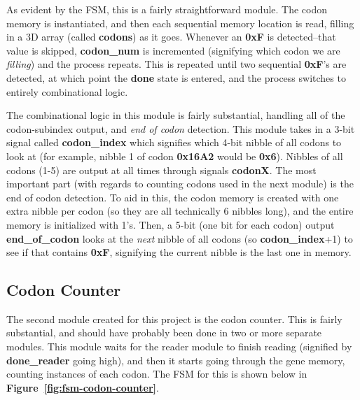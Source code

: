 \documentclass[a4paper, 12pt]{article}
\begin{document}
As evident by the FSM, this is a fairly straightforward module. The codon memory is instantiated, and then each sequential memory location is read, filling in a 3D array (called \textbf{codons}) as it goes. Whenever an \textbf{0xF} is detected--that value is skipped, \textbf{codon\_num} is incremented (signifying which codon we are \textit{filling}) and the process repeats. This is repeated until two sequential \textbf{0xF}'s are detected, at which point the \textbf{done} state is entered, and the process switches to entirely combinational logic. 

The combinational logic in this module is fairly substantial, handling all of the codon-subindex output, and \textit{end of codon} detection. This module takes in a 3-bit signal called \textbf{codon\_index} which signifies which 4-bit nibble of all codons to look at (for example, nibble 1 of codon \textbf{0x16A2} would be \textbf{0x6}). Nibbles of all codons (1-5) are output at all times through signals \textbf{codonX}. The most important part (with regards to counting codons used in the next module) is the end of codon detection. To aid in this, the codon memory is created with one extra nibble per codon (so they are all technically 6 nibbles long), and the entire memory is initialized with 1's. Then, a 5-bit (one bit for each codon) output \textbf{end\_of\_codon} looks at the \textit{next} nibble of all codons (so \textbf{codon\_index}+1) to see if that contains \textbf{0xF}, signifying the current nibble is the last one in memory.

\subsection{Codon Counter}
The second module created for this project is the codon counter. This is fairly substantial, and should have probably been done in two or more separate modules. This module waits for the reader module to finish reading (signified by \textbf{done\_reader} going high), and then it starts going through the gene memory, counting instances of each codon. The FSM for this is shown below in \textbf{Figure~\ref{fig:fsm-codon-counter}}.
\end{document}
